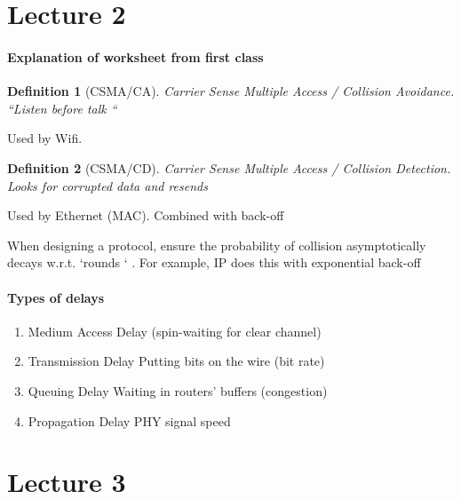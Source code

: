 \documentclass{article}
\newtheorem{defn}{Definition}[section]
\begin{document}
\section{Lecture 2}
\paragraph{Explanation of worksheet from first class}
\begin{defn}[CSMA/CA]
  Carrier Sense Multiple Access / Collision Avoidance. ``Listen before talk ``
\end{defn}
Used by Wifi.
\begin{defn}[CSMA/CD]
  Carrier Sense Multiple Access / Collision Detection. Looks for corrupted data and resends
\end{defn}
\noindent Used by Ethernet (MAC). Combined with back-off


When designing a protocol, ensure the probability of collision asymptotically decays w.r.t. `rounds ` .
For example, IP does this with exponential back-off

\paragraph{Types of delays}
\begin{enumerate}
  \setlength\itemsep{0em}
  \item Medium Access Delay
    \subitem (spin-waiting for clear channel)
  \item Transmission Delay
    \subitem Putting bits on the wire (bit rate)
  \item Queuing Delay
    \subitem Waiting in routers' buffers (congestion)
  \item Propagation Delay
    \subitem PHY signal speed
\end{enumerate}


\section{Lecture 3}
\end{document}
